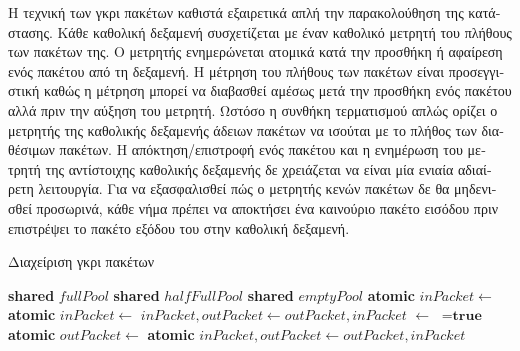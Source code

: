 \begin{greek}
Η τεχνική των γκρι πακέτων καθιστά εξαιρετικά απλή την
παρακολούθηση της κατάστασης. Κάθε καθολική δεξαμενή συσχετίζεται
με έναν καθολικό μετρητή του πλήθους των πακέτων της. Ο μετρητής
ενημερώνεται ατομικά κατά την προσθήκη ή αφαίρεση ενός
πακέτου από τη δεξαμενή. Η μέτρηση του πλήθους των πακέτων
είναι προσεγγιστική καθώς η μέτρηση μπορεί να διαβασθεί
αμέσως μετά την προσθήκη ενός πακέτου αλλά πριν την αύξηση
του μετρητή. Ωστόσο η συνθήκη τερματισμού απλώς ορίζει
ο μετρητής της καθολικής δεξαμενής άδειων πακέτων να ισούται
με το πλήθος των διαθέσιμων πακέτων. Η απόκτηση/επιστροφή
ενός πακέτου και η ενημέρωση του μετρητή της αντίστοιχης
καθολικής δεξαμενής δε χρειάζεται να είναι μία ενιαία
αδιαίρετη λειτουργία. Για να εξασφαλισθεί πώς ο μετρητής
κενών πακέτων δε θα μηδενισθεί προσωρινά, κάθε νήμα πρέπει
να αποκτήσει ένα καινούριο πακέτο εισόδου πριν επιστρέψει
το πακέτο εξόδου του στην καθολική δεξαμενή. 

\begin{algorithm}[H]
  \caption{Διαχείριση γκρι πακέτων}
  \label{alg:par4}
  \begin{algorithmic}[1]
    \State \textbf{shared} $fullPool$ 
    \State \textbf{shared} $halfFullPool$ 
    \State \textbf{shared} $emptyPool$ 
    \Statex
      \State \textbf{atomic}
      \State $inPacket \gets$ 
        \State \textbf{atomic}
        \State $inPacket \gets$ 
      \EndIf
        \State $inPacket, outPacket \gets outPacket, inPacket$
      \EndIf
      \State {}
    \EndFunction
    \Statex
        \State {} $\gets$  $=\textbf{true}$ 
      \EndFor
    \EndProcedure
    \Statex
        \State {}
      \EndIf
        \State \textbf{atomic}
        \State $outPacket \gets$ 
      \EndIf
        \State \textbf{atomic}
        \State {}
      \EndIf
          \State $inPacket, outPacket \gets outPacket, inPacket$
          \State \Return{\null}
        \EndIf  
      \EndIf
    \EndProcedure
    \Statex
      \State {}
        \State {}
      \Else
        \State {}
      \EndIf
    \EndProcedure
  \end{algorithmic}
\end{algorithm}


\end{greek}
